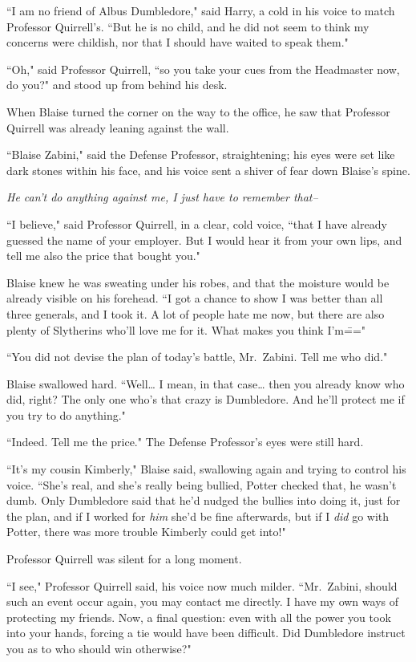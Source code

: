 ``I am no friend of Albus Dumbledore," said Harry, a cold in his voice to match Professor Quirrell's. ``But he is no child, and he did not seem to think my concerns were childish, nor that I should have waited to speak them."

``Oh," said Professor Quirrell, ``so you take your cues from the Headmaster now, do you?" and stood up from behind his desk.

\later

When Blaise turned the corner on the way to the office, he saw that Professor Quirrell was already leaning against the wall.

``Blaise Zabini," said the Defense Professor, straightening; his eyes were set like dark stones within his face, and his voice sent a shiver of fear down Blaise's spine.

\emph{He can't do anything against me, I just have to remember that\---}

``I believe," said Professor Quirrell, in a clear, cold voice, ``that I have already guessed the name of your employer. But I would hear it from your own lips, and tell me also the price that bought you."

Blaise knew he was sweating under his robes, and that the moisture would be already visible on his forehead. ``I got a chance to show I was better than all three generals, and I took it. A lot of people hate me now, but there are also plenty of Slytherins who'll love me for it. What makes you think I'm\==="

``You did not devise the plan of today's battle, Mr.~Zabini. Tell me who did."

Blaise swallowed hard. ``Well{\ldots} I mean, in that case{\ldots} then you already know who did, right? The only one who's that crazy is Dumbledore. And he'll protect me if you try to do anything."

``Indeed. Tell me the price." The Defense Professor's eyes were still hard.

``It's my cousin Kimberly," Blaise said, swallowing again and trying to control his voice. ``She's real, and she's really being bullied, Potter checked that, he wasn't dumb. Only Dumbledore said that he'd nudged the bullies into doing it, just for the plan, and if I worked for \emph{him} she'd be fine afterwards, but if I \emph{did} go with Potter, there was more trouble Kimberly could get into!"

Professor Quirrell was silent for a long moment.

``I see," Professor Quirrell said, his voice now much milder. ``Mr.~Zabini, should such an event occur again, you may contact me directly. I have my own ways of protecting my friends. Now, a final question: even with all the power you took into your hands, forcing a tie would have been difficult. Did Dumbledore instruct you as to who should win otherwise?"

